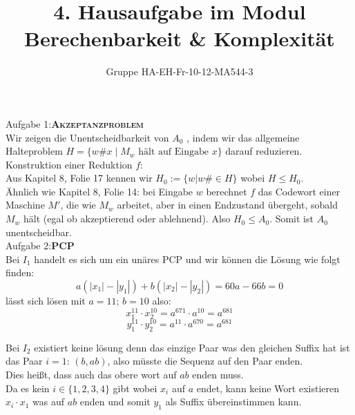 \documentclass[a4paper,onecolumn,oneside,12pt,ngerman]{article}
\date{}
\title{4. Hausaufgabe im Modul \\ \glqq Berechenbarkeit \& Komplexität\grqq} %
\author{Gruppe HA-EH-Fr-10-12-MA544-3} %
\theoremstyle{plain} %
\theoremstyle{definition} %
\theoremstyle{remark} %
\theoremstyle{plain}
\begin{document}

\maketitle
\newpage
Aufgabe 1:\quad \textsc{\textbf{Akzeptanzproblem}}
\vspace{20pt}\\
Wir zeigen die Unentscheidbarkeit von  $A_0$ , indem wir das allgemeine Halteproblem  $H = \{ w\#x \mid M_w \text{ hält auf Eingabe } x \}$  darauf reduzieren.
\\Konstruktion einer Reduktion $f$:\\
Aus Kapitel 8, Folie 17 kennen wir $H_0 := \{w\vert w\# \in H\}$ wobei $H\leq H_0$.\\
Ähnlich wie Kapitel 8, Folie 14: bei Eingabe $w$ berechnet $f$ das Codewort einer Maschine $M'$, die wie $M_w$ arbeitet, 
aber in einen Endzustand übergeht, sobald $M_w$ hält (egal ob akzeptierend oder ablehnend).
Also $H_0\leq A_0$. Somit ist $A_0$ unentscheidbar.
\vspace{30pt}\\
Aufgabe 2:\quad \textsc{\textbf{PCP}}\\

Bei $I_1$ handelt es sich um ein unäres PCP und wir können die Lösung wie folgt finden:
$$a(|x_1|-|y_1|) + b(|x_2|-|y_2|) = 60a - 66b = 0$$
lässt sich lösen mit $a=11;\, b=10$ also: 
$$x_1^{11}\cdot x_2^{10} = a^{671}\cdot a^{10} = a^{681}$$
$$y_1^{11}\cdot y_2^{10} = a^{11}\cdot a^{670} = a^{681}$$

Bei $I_2$ existiert keine lösung denn das einzige Paar was den gleichen Suffix hat ist das Paar $i=1:\,(b,ab)$, also müsste die Sequenz auf den Paar enden.\\
Dies heißt, dass auch das obere wort auf $ab$ enden muss.\\
Da es kein $i\in\{1,2,3,4\}$ gibt wobei $x_i$ auf $a$ endet, kann keine Wort existieren $x_i\cdot x_1$ was auf $ab$ enden und somit $y_1$ als Suffix übereinstimmen kann.
\end{document}
